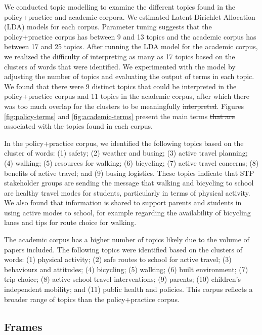 \documentclass[preprint, 3p,
authoryear]{elsarticle} %
\providecommand{\DIFaddtex}[1]{{\protect\color{blue}\uwave{#1}}} %
\providecommand{\DIFdeltex}[1]{{\protect\color{red}\sout{#1}}}                      %
\providecommand{\DIFaddbegin}{} %
\providecommand{\DIFaddend}{} %
\providecommand{\DIFdelbegin}{} %
\providecommand{\DIFdelend}{} %
\providecommand{\DIFadd}[1]{\texorpdfstring{\DIFaddtex{#1}}{#1}} %
\providecommand{\DIFdel}[1]{\texorpdfstring{\DIFdeltex{#1}}{}} %
\newcommand{\DIFscaledelfig}{0.5}
\newlength{\DIFdelgraphicswidth} %
\newlength{\DIFdelgraphicsheight} %
\newcommand{\DIFaddincludegraphics}[2][]{{\color{blue}\fbox{\DIFOincludegraphics[#1]{#2}}}} %
\newcommand{\DIFdelincludegraphics}[2][]{%
\sbox{\DIFdelgraphicsbox}{\DIFOincludegraphics[#1]{#2}}%
\settoboxwidth{\DIFdelgraphicswidth}{\DIFdelgraphicsbox} %
\settoboxtotalheight{\DIFdelgraphicsheight}{\DIFdelgraphicsbox} %
\scalebox{\DIFscaledelfig}{%
\parbox[b]{\DIFdelgraphicswidth}{\usebox{\DIFdelgraphicsbox}\\[-\baselineskip] \rule{\DIFdelgraphicswidth}{0em}}\llap{\resizebox{\DIFdelgraphicswidth}{\DIFdelgraphicsheight}{%
\setlength{\unitlength}{\DIFdelgraphicswidth}%
\begin{picture}(1,1)%
\thicklines\linethickness{2pt} %
{\color[rgb]{1,0,0}\put(0,0){\framebox(1,1){}}}%
{\color[rgb]{1,0,0}\put(0,0){\line( 1,1){1}}}%
{\color[rgb]{1,0,0}\put(0,1){\line(1,-1){1}}}%
\end{picture}%
}\hspace*{3pt}}} %
} %
\DeclareRobustCommand{\DIFaddbegin}{\DIFOaddbegin \let\includegraphics\DIFaddincludegraphics} %
\DeclareRobustCommand{\DIFaddend}{\DIFOaddend \let\includegraphics\DIFOincludegraphics} %
\DeclareRobustCommand{\DIFdelbegin}{\DIFOdelbegin \let\includegraphics\DIFdelincludegraphics} %
\DeclareRobustCommand{\DIFdelend}{\DIFOaddend \let\includegraphics\DIFOincludegraphics} %
\begin{document}
We conducted topic modelling to examine the different topics found in
the policy+practice and academic corpora. We estimated Latent Dirichlet
Allocation (LDA) models for each corpus. Parameter tuning suggests that
the policy+practice corpus has between 9 and 13 topics and the academic
corpus has between 17 and 25 topics. After running the LDA model for the
academic corpus, we realized the difficulty of interpreting as many as
17 topics based on the clusters of words that were identified. We
experimented with the model by adjusting the number of topics and
evaluating the output of terms in each topic. We found that there were 9
distinct topics that could be interpreted in the policy+practice corpus
and 11 topics in the academic corpus, after which there was too much
overlap for the clusters to be meaningfully \DIFdelbegin \DIFdel{interpreted}\DIFdelend \DIFaddbegin \DIFadd{distinguished}\DIFaddend . Figures
\ref{fig:policy-terms} and \ref{fig:academic-terms} present the main
terms \DIFdelbegin \DIFdel{that are }\DIFdelend associated with the topics found in each corpus.

In the policy+practice corpus, we identified the following topics based
on the cluster of words: (1) safety; (2) weather and busing; (3) active
travel planning; (4) walking; (5) resources for walking; (6) bicycling;
(7) active travel concerns; (8) benefits of active travel; and (9)
busing logistics. These topics indicate that STP stakeholder groups are
sending the message that walking and bicycling to school are healthy
travel modes for students, particularly in terms of physical activity.
We also found that information is shared to support parents and students
in using active modes to school, for example regarding the availability
of bicycling lanes and tips for route choice for walking.

The academic corpus has a higher number of topics likely due to the
volume of papers included. The following topics were identified based on
the clusters of words: (1) physical activity; (2) safe routes to school
for active travel; (3) behaviours and attitudes; (4) bicycling; (5)
walking; (6) built environment; (7) trip choice; (8) active school
travel interventions; (9) parents; (10) children's independent mobility;
and (11) public health and policies. This corpus reflects a broader
range of topics than the policy+practice corpus.

\hypertarget{frames}{%
\subsection{Frames}\label{frames}}
\end{document}
